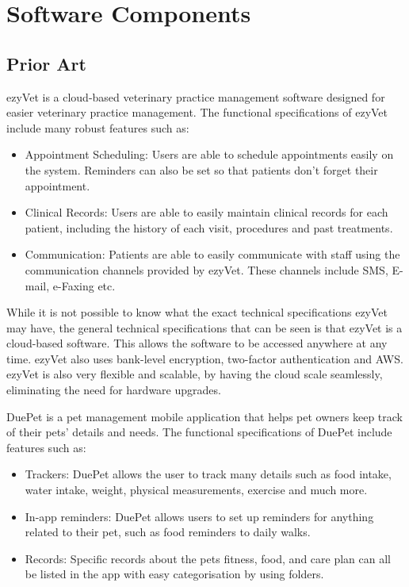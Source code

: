 
\chapter{Software Components}

\section{Prior Art}

ezyVet is a cloud-based veterinary practice management software designed for easier veterinary practice management. The functional specifications of ezyVet include many robust features such as:

\begin{itemize}
    \item Appointment Scheduling: Users are able to schedule appointments easily on the system. Reminders can also be set so that patients don't forget their appointment.
    \item Clinical Records: Users are able to easily maintain clinical records for each patient, including the history of each visit, procedures and past treatments.
    \item Communication: Patients are able to easily communicate with staff using the communication channels provided by ezyVet. These channels include SMS, E-mail, e-Faxing etc.
\end{itemize}

While it is not possible to know what the exact technical specifications ezyVet may have, the general technical specifications that can be seen is that ezyVet is a cloud-based software. This allows the software to be accessed anywhere at any time. ezyVet also uses bank-level encryption, two-factor authentication and AWS. ezyVet is also very flexible and scalable, by having the cloud scale seamlessly, eliminating the need for hardware upgrades.

DuePet is a pet management mobile application that helps pet owners keep track of their pets' details and needs. The functional specifications of DuePet include features such as:
\begin{itemize}
    \item Trackers: DuePet allows the user to track many details such as food intake, water intake, weight, physical measurements, exercise and much more.
    \item In-app reminders: DuePet allows users to set up reminders for anything related to their pet, such as food reminders to daily walks.
    \item Records: Specific records about the pets fitness, food, and care plan can all be listed in the app with easy categorisation by using folders.
\end{itemize}

